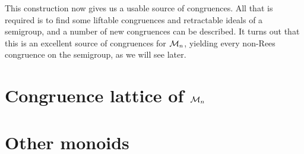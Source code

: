 This construction now gives us a usable source of congruences.  All that is
required is to find some liftable congruences and retractable ideals of a
semigroup, and a number of new congruences can be described.  It turns out that
this is an excellent source of congruences for $\mathcal{M}_n$, yielding every non-Rees
congruence on the semigroup, as we will see later.

\section{Congruence lattice of $\mathcal{M}_n$}
\label{sec:motzkin-congs}







\section{Other monoids}
\label{sec:motzkin-other}
